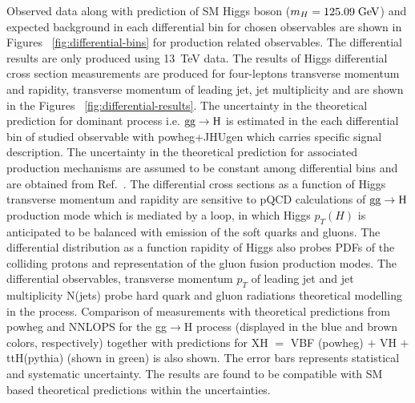 Observed data along with prediction of SM Higgs boson ($m_{H}=125.09 \hbox{$\;\hbox{\rm GeV}$}$) and expected background in each differential bin for
 chosen observables are shown in Figures ~\ref{fig:differential-bins} for production related observables. 
The differential results are only produced using 13~TeV data. 
The results of Higgs differential cross section measurements are produced for four-leptons transverse momentum and rapidity, transverse momentum of leading jet, jet multiplicity and are shown in the Figures ~\ref{fig:differential-results}. 
The uncertainty in the theoretical prediction for dominant process i.e. ${\rm gg}\rightarrow{\rm H}$ is estimated in the each differential bin of studied observable with {\sc powheg+JHUgen} which carries specific signal description. 
The uncertainty in the theoretical prediction for associated production mechanisms are assumed to be constant among differential bins and  are obtained from Ref.~\cite{LHCHiggsCrossSectionWorkingGroup:2013tqa}.
The differential cross sections as a function of Higgs transverse momentum and rapidity are sensitive to pQCD calculations of
${\rm gg}\rightarrow{\rm H}$ production mode which is mediated by a loop, in which Higgs $p_T(H)$ is anticipated to be balanced with emission of the soft quarks and gluons. The differential distribution as a function rapidity of Higgs also probes PDFs of the colliding protons and representation of the gluon fusion production modes. 
The differential observables, transverse momentum $p_T$ of leading jet and jet multiplicity N(jets) probe hard quark and gluon radiations theoretical modelling in the process. %
Comparison of measurements with theoretical predictions
from {\sc powheg} and {\sc NNLOPS} for the gg$\rightarrow$H process (displayed in the blue and brown colors, respectively) together with predictions for XH $=$ VBF ({\sc powheg}) $+$ VH $+$ ttH({\sc pythia}) (shown in green) is also shown. The error bars represents  
statistical and systematic uncertainty.
The results are found to be compatible with SM based theoretical predictions within the uncertainties.  
